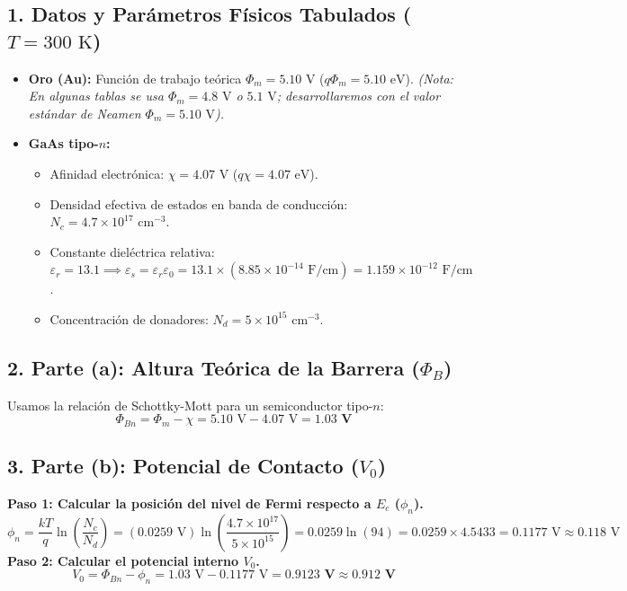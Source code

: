 \documentclass[11pt,a4paper]{article}
\begin{document}
\subsection*{1. Datos y Parámetros Físicos Tabulados ($T = 300\text{ K}$)}
\begin{itemize}
    \item \textbf{Oro (Au):} Función de trabajo teórica $\Phi_m = 5.10\text{ V}$ ($q\Phi_m = 5.10\text{ eV}$). \textit{(Nota: En algunas tablas se usa $\Phi_m = 4.8\text{ V}$ o $5.1\text{ V}$; desarrollaremos con el valor estándar de Neamen $\Phi_m = 5.10\text{ V}$).}
    \item \textbf{GaAs tipo-$n$:}
    \begin{itemize}
        \item Afinidad electrónica: $\chi = 4.07\text{ V}$ ($q\chi = 4.07\text{ eV}$).
        \item Densidad efectiva de estados en banda de conducción: $N_c = 4.7 \times 10^{17}\text{ cm}^{-3}$.
        \item Constante dieléctrica relativa: $\varepsilon_r = 13.1 \implies \varepsilon_s = \varepsilon_r \varepsilon_0 = 13.1 \times (8.85 \times 10^{-14}\text{ F/cm}) = 1.159 \times 10^{-12}\text{ F/cm}$.
        \item Concentración de donadores: $N_d = 5 \times 10^{15}\text{ cm}^{-3}$.
    \end{itemize}
\end{itemize}

\subsection*{2. Parte (a): Altura Teórica de la Barrera ($\Phi_B$)}
Usamos la relación de Schottky-Mott para un semiconductor tipo-$n$:
\[
\Phi_{Bn} = \Phi_m - \chi = 5.10\text{ V} - 4.07\text{ V} = \mathbf{1.03\text{ V}}
\]

\subsection*{3. Parte (b): Potencial de Contacto ($V_0$)}
\textbf{Paso 1: Calcular la posición del nivel de Fermi respecto a $E_c$ ($\phi_n$).}
\[
\phi_n = \frac{kT}{q}\ln\left(\frac{N_c}{N_d}\right) = (0.0259\text{ V}) \ln\left(\frac{4.7 \times 10^{17}}{5 \times 10^{15}}\right) = 0.0259 \ln(94) = 0.0259 \times 4.5433 = 0.1177\text{ V} \approx 0.118\text{ V}
\]
\textbf{Paso 2: Calcular el potencial interno $V_0$.}
\[
V_0 = \Phi_{Bn} - \phi_n = 1.03\text{ V} - 0.1177\text{ V} = \mathbf{0.9123\text{ V} \approx 0.912\text{ V}}
\]
\end{document}
